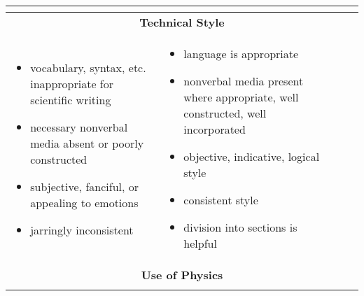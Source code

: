 \documentclass[
    8pt,
    DIV=42,
    BCOR=0mm,
    pagenumber=off,
    paper=5.5in:8.5in,
    pagesize,
]{scrartcl}
\begin{document}
\begin{tabularx}{\textwidth}{|X|X|m{0.557in}|c|}
\begin{itemize}[leftmargin=*]
\end{itemize}                                                                    &                          &                        \\ \hline
 \multicolumn{4}{|c|}{\textbf{Technical Style}}                                                                                                                                                                       \\ \hline
 \begin{itemize}[leftmargin=*]
  \item{vocabulary, syntax, etc. inappropriate for scientific writing}
  \item{necessary nonverbal media absent or poorly constructed}
  \item{subjective, fanciful, or appealing to emotions}
  \item{jarringly inconsistent}
 \end{itemize}                                                                 & \begin{itemize}[leftmargin=*]
                                                                                  \item{language is appropriate}
                                                                                  \item{nonverbal media present where appropriate, well constructed, well incorporated}
                                                                                  \item{objective, indicative, logical style}
                                                                                  \item{consistent style}
                                                                                  \item{division into sections is helpful}
                                                                                 \end{itemize}                                                                    &                          &                        \\ \hline
 \multicolumn{4}{|c|}{\textbf{Use of Physics}}                                                                                                                                                                        \\ \hline
 \begin{itemize}[leftmargin=*]

\end{itemize}
\end{tabularx}
\end{document}
